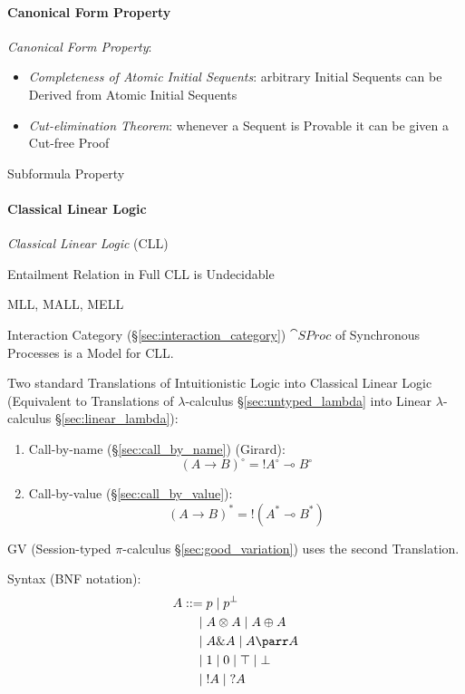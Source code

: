 \paragraph{Canonical Form Property}\label{sec:canonical_form_property}\hfill

\emph{Canonical Form Property}:
\begin{itemize}
  \item \emph{Completeness of Atomic Initial Sequents}: arbitrary
    Initial Sequents can be Derived from Atomic Initial Sequents
  \item \emph{Cut-elimination Theorem}: whenever a Sequent is Provable
    it can be given a Cut-free Proof
\end{itemize}

Subformula Property



\paragraph{Classical Linear Logic}\label{sec:cll} \hfill

\emph{Classical Linear Logic} (CLL)

Entailment Relation in Full CLL is Undecidable

MLL, MALL, MELL

Interaction Category (\S\ref{sec:interaction_category}) $\cat{SProc}$
of Synchronous Processes is a Model for CLL.

Two standard Translations of Intuitionistic Logic into Classical
Linear Logic (Equivalent to Translations of $\lambda$-calculus
\S\ref{sec:untyped_lambda} into Linear
$\lambda$-calculus \S\ref{sec:linear_lambda}):\cite{wadler12}
\begin{enumerate}
  \item Call-by-name (\S\ref{sec:call_by_name}) (Girard):
\[
  (A \rightarrow B)^\circ = !A^\circ \multimap B^\circ
\]
  \item Call-by-value (\S\ref{sec:call_by_value}):
\[
  (A \rightarrow B)^* = !(A^* \multimap B^*)
\]
\end{enumerate}
GV (Session-typed $\pi$-calculus \S\ref{sec:good_variation}) uses the
second Translation.

Syntax (BNF notation):
\[
\begin{split}
  A ::=& \; p \; | \; p^\bot\\
      |& \; A \otimes A \; | \; A \oplus A\\
      |& \; A \& A \; | \; A \parr A\\
      |& \; 1 \; | \; 0 \; | \; \top \; | \; \bot\\
      |& \; !A \; | \; ?A
\end{split}
\]

